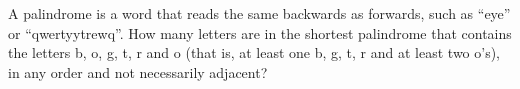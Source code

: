 A palindrome is a word that reads the same backwards as forwards, such as ``eye'' or ``qwertyytrewq''. How many letters are in the shortest palindrome that contains the letters b, o, g, t, r and o (that is, at least one b, g, t, r and at least two o's), in any order and not necessarily adjacent?
